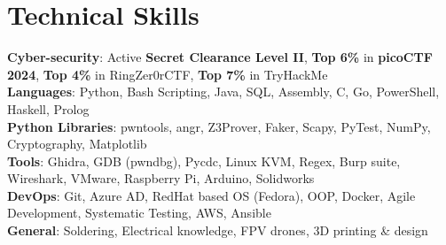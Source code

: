 \section{Technical Skills}

\begin{itemize}[leftmargin=0.15in, label={}]
    \small{\item{
        \textbf{Cyber-security}{: Active \textbf{Secret Clearance Level II}, \textbf{Top 6\%} in \textbf{picoCTF 2024}, \textbf{Top 4\%} in RingZer0rCTF, \textbf{Top 7\%} in TryHackMe} \\ \vspace{1.5mm} %
        \textbf{Languages}{: Python, Bash Scripting, Java, SQL, Assembly, C, Go, PowerShell, Haskell, Prolog} \\ \vspace{1.5mm}
        \textbf{Python Libraries}{: pwntools, angr, Z3Prover, Faker, Scapy, PyTest, NumPy, Cryptography, Matplotlib} \\ \vspace{1.5mm}
        \textbf{Tools}{: Ghidra, GDB (pwndbg), Pycdc, Linux KVM, Regex, Burp suite, Wireshark, VMware, Raspberry Pi, Arduino, Solidworks} \\ \vspace{1.5mm}
        \textbf{DevOps}{: Git, Azure AD, RedHat based OS (Fedora), OOP, Docker, Agile Development, Systematic Testing, AWS, Ansible}\\ \vspace{1.5mm}
        \textbf{General}{: Soldering, Electrical knowledge, FPV drones, 3D printing \& design}\\
    }}
\end{itemize}